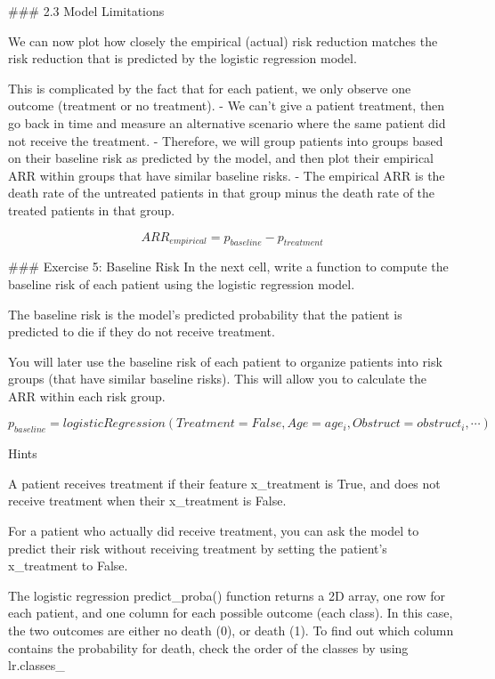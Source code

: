 \documentclass[11pt]{article}
\begin{document}
     \#\#\# 2.3 Model Limitations

We can now plot how closely the empirical (actual) risk reduction
matches the risk reduction that is predicted by the logistic regression
model.

This is complicated by the fact that for each patient, we only observe
one outcome (treatment or no treatment). - We can't give a patient
treatment, then go back in time and measure an alternative scenario
where the same patient did not receive the treatment. - Therefore, we
will group patients into groups based on their baseline risk as
predicted by the model, and then plot their empirical ARR within groups
that have similar baseline risks. - The empirical ARR is the death rate
of the untreated patients in that group minus the death rate of the
treated patients in that group.

\[ARR_{empirical} = p_{baseline} - p_{treatment}\]

     \#\#\# Exercise 5: Baseline Risk In the next cell, write a function to
compute the baseline risk of each patient using the logistic regression
model.

The baseline risk is the model's predicted probability that the patient
is predicted to die if they do not receive treatment.

You will later use the baseline risk of each patient to organize
patients into risk groups (that have similar baseline risks). This will
allow you to calculate the ARR within each risk group.

\[p_{baseline} = logisticRegression(Treatment = False, Age = age_{i}, Obstruct = obstruct_{i}, \cdots)\]

     Hints

A patient receives treatment if their feature x\_treatment is True, and
does not receive treatment when their x\_treatment is False.

For a patient who actually did receive treatment, you can ask the model
to predict their risk without receiving treatment by setting the
patient's x\_treatment to False.

The logistic regression predict\_proba() function returns a 2D array,
one row for each patient, and one column for each possible outcome (each
class). In this case, the two outcomes are either no death (0), or death
(1). To find out which column contains the probability for death, check
the order of the classes by using lr.classes\_
\end{document}
